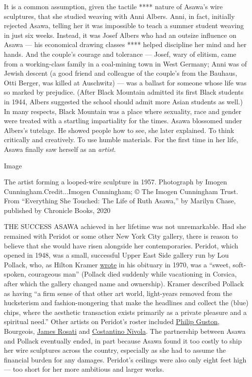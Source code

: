 It is a common assumption, given the tactile **** nature of Asawa's wire
sculptures, that she studied weaving with Anni Albers. Anni, in fact,
initially rejected Asawa, telling her it was impossible to teach a
summer student weaving in just six weeks. Instead, it was Josef Albers
who had an outsize influence on Asawa --- his economical drawing classes
**** helped discipline her mind and her hands. And the couple's courage
and tolerance --- Josef, wary of elitism, came from a working-class
family in a coal-mining town in West Germany; Anni was of Jewish descent
(a good friend and colleague of the couple's from the Bauhaus, Otti
Berger, was killed at Auschwitz) --- was a ballast for someone whose
life was so marked by prejudice. (After Black Mountain admitted its
first Black students in 1944, Albers suggested the school should admit
more Asian students as well.) In many respects, Black Mountain was a
place where sexuality, race and gender were treated with a startling
impartiality for the times. Asawa blossomed under Albers's tutelage. He
showed people how to see, she later explained. To think critically and
creatively. To use humble materials. For the first time in her life,
Asawa finally saw herself as an \emph{artist}.

Image

The artist forming a looped-wire sculpture in 1957. Photograph by Imogen
Cunningham.Credit...Imogen Cunningham; © The Imogen Cunningham Trust.
From ``Everything She Touched: The Life of Ruth Asawa,'' by Marilyn
Chase, published by Chronicle Books, 2020

THE SUCCESS ASAWA achieved in her lifetime was not unremarkable. Had she
remained with Peridot or some other New York City gallery, there is
reason to believe that she would have risen alongside her
contemporaries. Peridot, which opened in 1948, was a small, successful
Upper East Side gallery run by Lou Pollack, who, as Hilton Kramer
\href{https://www.nytimes3xbfgragh.onion/1970/12/06/archives/an-ambience-all-too-rare.html}{wrote}
in his obituary in 1970, was a ``sweet, soft‐spoken, courageous man''
(Pollack died suddenly while vacationing in Corsica, after which the
gallery changed name and ownership). Kramer described Pollack as having
``a firm sense of that other art world, light-years removed from the
hucksterism and fashion-mongering that make the headlines and collect
the (blue) chips, where the aesthetic transaction exists primarily as a
private pleasure and a spiritual need.'' Other artists on Peridot's
roster included
\href{https://www.nytimes3xbfgragh.onion/2017/05/16/t-magazine/art/philip-guston-venice.html}{Philip
Guston}, Bourgeois,
\href{https://www.nytimes3xbfgragh.onion/1988/02/27/obituaries/james-rosati-76-sculptor-noted-for-monumental-works-is-dead.html}{James
Rosati} and
\href{https://www.nytimes3xbfgragh.onion/1988/05/07/obituaries/costantino-nivola-76-a-sculptor-of-public-and-small-scale-works.html}{Costantino
Nivola}. The partnership between Asawa and Pollack eventually ended, in
part because Asawa found it too costly to ship her wire sculptures
across the country, especially as she had to assume the financial burden
for any damages. Peridot's ceilings were also only eight feet high ---
too short for her more ambitious and larger works.

